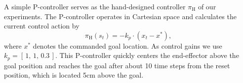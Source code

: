 A simple P-controller serves as the hand-designed controller $\pi_\text{H}$ of our experiments.  The P-controller operates in Cartesian space and calculates the current control action by 
\begin{equation}
\pi_\text{H}(s_t) = - k_p\cdot (x_t - x^{*}), 
\end{equation}
where $x^{*}$ denotes the commanded goal location. As control gains we use $k_p = [\,1, \,1,\, 0.3\,]$. This P-controller quickly centers the end-effector above the goal position and reaches the goal after about 10 time steps from the reset position, which is located 5cm above the goal.

\begin{figure}[btp]
    \centering
\end{figure}
